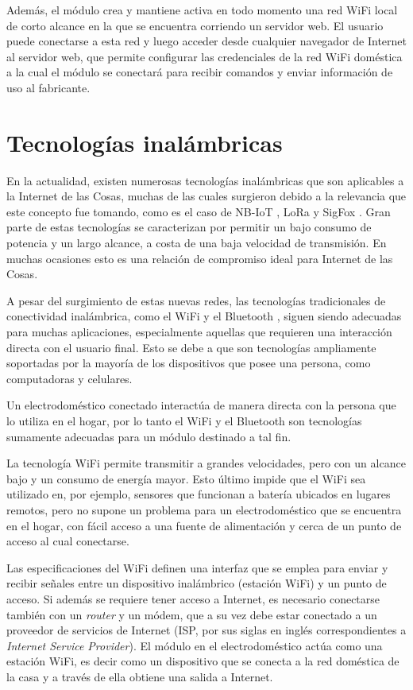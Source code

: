 Además, el módulo crea y mantiene activa en todo momento una red WiFi local de corto alcance en la que se encuentra corriendo un servidor web. El usuario puede conectarse a esta red y luego acceder desde cualquier navegador de Internet al servidor web, que permite configurar las credenciales de la red WiFi doméstica a la cual el módulo se conectará para recibir comandos y enviar información de uso al fabricante.

\section{Tecnologías inalámbricas}

En la actualidad, existen numerosas tecnologías inalámbricas que son aplicables a la Internet de las Cosas, muchas de las cuales surgieron debido a la relevancia que este concepto fue tomando, como es el caso de NB-IoT \citep{nb_iot}, LoRa \citep{lora} y SigFox \citep{sigfox}. Gran parte de estas tecnologías se caracterizan por permitir un bajo consumo de potencia y un largo alcance, a costa de una baja velocidad de transmisión. En muchas ocasiones esto es una relación de compromiso ideal para Internet de las Cosas.

A pesar del surgimiento de estas nuevas redes, las tecnologías tradicionales de conectividad inalámbrica, como el WiFi \citep{wifi} y el Bluetooth \citep{bluetooth}, siguen siendo adecuadas para muchas aplicaciones, especialmente aquellas que requieren una interacción directa con el usuario final. Esto se debe a que son tecnologías ampliamente soportadas por la mayoría de los dispositivos que posee una persona, como computadoras y celulares.

Un electrodoméstico conectado interactúa de manera directa con la persona que lo utiliza en el hogar, por lo tanto el WiFi y el Bluetooth son tecnologías sumamente adecuadas para un módulo destinado a tal fin.

La tecnología WiFi permite transmitir a grandes velocidades, pero con un alcance bajo y un consumo de energía mayor. Esto último impide que el WiFi sea utilizado en, por ejemplo, sensores que funcionan a batería ubicados en lugares remotos, pero no supone un problema para un electrodoméstico que se encuentra en el hogar, con fácil acceso a una fuente de alimentación y cerca de un punto de acceso al cual conectarse. 

Las especificaciones del WiFi definen una interfaz que se emplea para enviar y recibir señales entre un dispositivo inalámbrico (estación WiFi) y un punto de acceso. Si además se requiere tener acceso a Internet, es necesario conectarse también con un \emph{router} y un módem, que a su vez debe estar conectado a un proveedor de servicios de Internet (ISP, por sus siglas en inglés correspondientes a \emph{Internet Service Provider}). El módulo en el electrodoméstico actúa como una estación WiFi, es decir como un dispositivo que se conecta a la red doméstica de la casa y a través de ella obtiene una salida a Internet.

